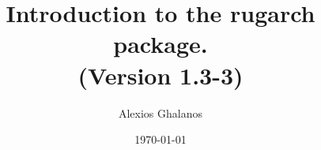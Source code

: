 \documentclass[11pt,a4paper]{article}
\begin{document}
\title{Introduction to the rugarch package.\\
(Version 1.3-3)}
\author{Alexios Ghalanos}
\date{\today}
\maketitle
\tableofcontents
\newpage

\clearpage

\end{document}

